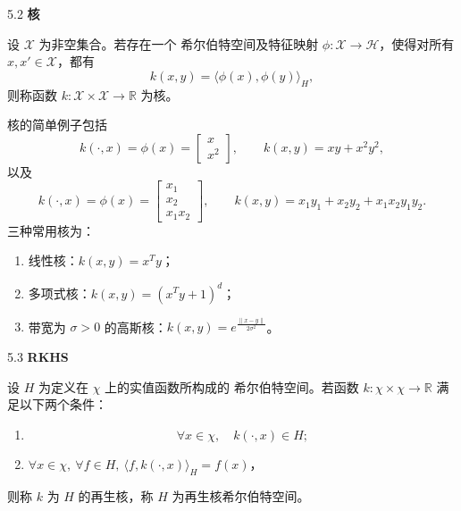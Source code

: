 

\begin{bookdefinition}{5.2}
\textbf{核}

设 $\mathcal X$ 为非空集合。若存在一个 希尔伯特空间及特征映射 $\phi:\mathcal X\to\mathcal H$，使得对所有 $x,x'\in\mathcal X$，都有
\begin{equation}
k(x,y)=\langle\phi(x),\phi(y)\rangle_H,
\tag{5.19}
\end{equation}
则称函数 $k:\mathcal X\times\mathcal X\to\mathbb R$ 为核。
\end{bookdefinition}

核的简单例子包括
\[
k(\cdot,x)=\phi(x)=\begin{bmatrix}x\\x^2\end{bmatrix},\qquad
k(x,y)=xy+x^2y^2,
\]
以及
\[
k(\cdot,x)=\phi(x)=\begin{bmatrix}x_1\\x_2\\x_1x_2\end{bmatrix},\qquad
k(x,y)=x_1y_1+x_2y_2+x_1x_2y_1y_2.
\]
三种常用核为：
\begin{enumerate}
\item 线性核：$k(x,y)=x^Ty$；
\item 多项式核：$k(x,y)=(x^Ty+1)^d$；
\item 带宽为 $\sigma>0$ 的高斯核：$k(x,y)=e^{\frac{\lVert x-y\rVert}{2\sigma^2}}$。
\end{enumerate}

\begin{bookdefinition}{5.3}
\textbf{RKHS}

设 $H$ 为定义在 $\chi$ 上的实值函数所构成的 希尔伯特空间。若函数 $k:\chi\times\chi\to\mathbb R$ 满足以下两个条件：
\begin{enumerate}
\item
\begin{equation}
\forall x\in\chi,\quad k(\cdot,x)\in H;
\tag{5.20}
\end{equation}
\item $\forall x\in\chi,\ \forall f\in H,\ \langle f,k(\cdot,x)\rangle_H=f(x)$，
\end{enumerate}
则称 $k$ 为 $H$ 的再生核，称 $H$ 为再生核希尔伯特空间。
\end{bookdefinition}

